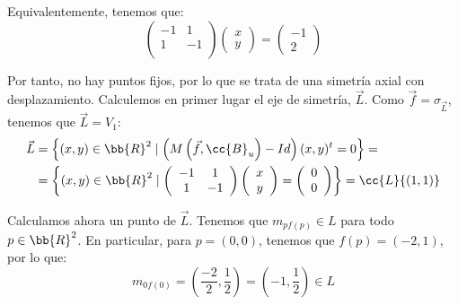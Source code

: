 \begin{ejercicio}
    Equivalentemente, tenemos que:
    \begin{equation*}
        \left(
        \begin{array}{cc}
            -1 & 1 \\
            1 & -1 \\
        \end{array}
        \right)
        \left(
        \begin{array}{c}
            x\\y
        \end{array}
        \right)
        =\left(
            \begin{array}{c}
                -1 \\ 2
            \end{array}
        \right)
    \end{equation*}

    Por tanto, no hay puntos fijos, por lo que se trata de una simetría axial con desplazamiento. Calculemos en primer lugar el eje de simetría, $\vec{L}$.
    Como $\vec{f}= \sigma_{\vec{L}}$, tenemos que $\vec{L}=V_1$:
    \begin{align*}
        \vec{L}&= \left\{(x,y)\in \bb{R}^2 \mid \left(M\left(\vec{f}, \cc{B}_u\right) - Id\right)(x,y)^t = 0\right\} =\\
        &= \left\{(x,y)\in \bb{R}^2 \mid \left(
        \begin{array}{cc}
            -1 & 1 \\
            1 & -1 \\
        \end{array}
        \right)
        \left(
        \begin{array}{c}
            x\\y
        \end{array}
        \right)
        =\left(
            \begin{array}{c}
                0 \\ 0
            \end{array}
        \right)\right\} = \cc{L}\{(1,1)\}
    \end{align*}

    Calculamos ahora un punto de $\vec{L}$. Tenemos que $m_{p f(p)}\in L$ para todo $p\in \bb{R}^2$. En particular, para $p=(0,0)$, tenemos que $f(p)=(-2,1)$, por lo que:
    \begin{equation*}
        m_{0 f(0)} = \left(\frac{-2}{2},\frac{1}{2}\right) = \left(-1, \frac{1}{2}\right) \in L
    \end{equation*}


\end{ejercicio}
